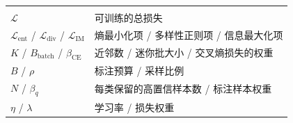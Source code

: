 \begin{denotation}
\begin{longtable}{@{}p{}p{}@{}}
\addlinespace[1.0ex]
\multicolumn{2}{@{}l}{\itshape 损失项与超参数}\\
\addlinespace[0.3ex]
$\mathcal{L}$ & 可训练的总损失 \\
$\mathcal{L}_{\text{ent}}$ / $\mathcal{L}_{\text{div}}$ / $\mathcal{L}_{\text{IM}}$ & 熵最小化项 / 多样性正则项 / 信息最大化项 \\
$K$ / $B_{\text{batch}}$ / $\beta_{\text{CE}}$ & 近邻数 / 迷你批大小 / 交叉熵损失的权重 \\
$B$ / $\rho$ & 标注预算 / 采样比例 \\
$N$ / $\beta_q$ & 每类保留的高置信样本数 / 标注样本权重 \\
$\eta$ / $\lambda$ & 学习率 / 损失权重 \\



\end{longtable}
\end{denotation}
